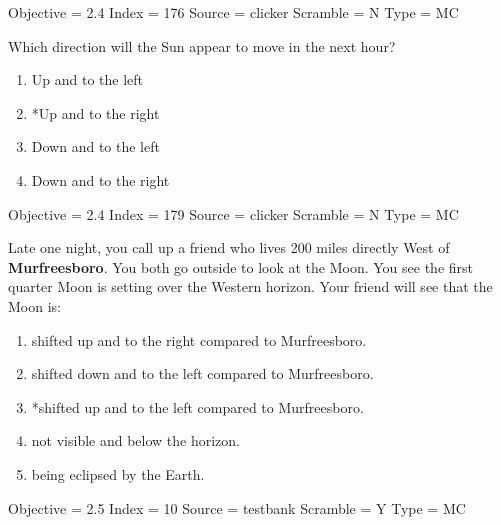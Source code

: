 \documentclass[11pt]{article}
\begin{document}
\begin{enumerate}
\begin{minipage}{\textwidth}
\begin{minipage}{\textwidth}
Objective = 2.4
Index = 176
Source = clicker
Scramble = N
Type = MC
\end{minipage}
\end{minipage}
\vskip 0.20in

\begin{minipage}{\textwidth}
\begin{minipage}{\textwidth}
\item Which direction will the Sun appear to move in the next hour?
\begin{multicols}{2}
\begin{enumerate} 
\setlength{\itemsep}{1pt} 
\setlength{\parskip}{0pt} 
\setlength{\parsep}{0pt}
\setlength{\multicolsep}{1pt} 
\item Up and to the left
\item *Up and to the right
\item Down and to the left
\item Down and to the right
\end{enumerate} 
\vfill 
\end{multicols}

Objective = 2.4
Index = 179
Source = clicker
Scramble = N
Type = MC
\end{minipage}
\end{minipage}
\vskip 0.20in

\begin{minipage}{\textwidth}
\begin{minipage}{\textwidth}
\item Late one night, you call up a friend who lives 200 miles directly West of {\bf Murfreesboro}.   You both go outside to look at the Moon.   You see the first quarter Moon is setting over the Western horizon.   Your friend will see that the Moon is:
\begin{enumerate} 
\setlength{\itemsep}{1pt} 
\setlength{\parskip}{0pt} 
\setlength{\parsep}{0pt}
\setlength{\multicolsep}{1pt} 
\item shifted  up and to the right compared to Murfreesboro.
\item shifted down and to the left  compared to Murfreesboro.
\item *shifted up and to the left compared to Murfreesboro.
\item not visible and below the horizon.
\item being eclipsed by the Earth.
\end{enumerate} 
Objective = 2.5
Index = 10
Source = testbank
Scramble = Y
Type = MC
\end{minipage}
\end{minipage}
\vskip 0.20in


\end{enumerate}
\end{document}
